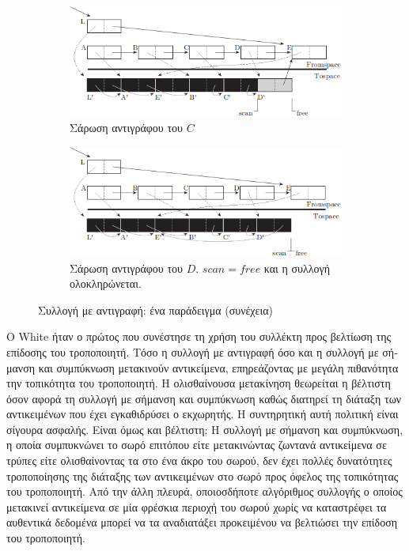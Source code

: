 \begin{greek}
\begin{figure}[H]
  \begin{subfigure}[b]{1.0\textwidth}
    \includegraphics{figures/cop_2b}
    \caption{Σάρωση αντιγράφου του $C$}
  \end{subfigure}
  
  \begin{subfigure}[b]{1.0\textwidth}
    \includegraphics{figures/cop_2c}
    \caption{Σάρωση αντιγράφου του $D$. $scan=free$ και η 
             συλλογή ολοκληρώνεται.}
  \end{subfigure}
  \caption{Συλλογή με αντιγραφή: ένα παράδειγμα (συνέχεια)}
  \label{fig:cop_2}
\end{figure}

O White \cite{DBLP:conf/lfp/White80} ήταν ο πρώτος που συνέστησε τη χρήση του συλλέκτη
προς βελτίωση της επίδοσης του τροποποιητή. Τόσο η συλλογή με
αντιγραφή όσο και η συλλογή με σήμανση και συμπύκνωση μετακινούν
αντικείμενα, επηρεάζοντας με μεγάλη πιθανότητα την τοπικότητα
του τροποποιητή. Η ολισθαίνουσα μετακίνηση θεωρείται η βέλτιστη
όσον αφορά τη συλλογή με σήμανση και συμπύκνωση καθώς διατηρεί
τη διάταξη των αντικειμένων που έχει εγκαθιδρύσει ο εκχωρητής.
Η συντηρητική αυτή πολιτική είναι σίγουρα ασφαλής. Είναι όμως
και βέλτιστη; Η συλλογή με σήμανση και συμπύκνωση, η οποία 
συμπυκνώνει το σωρό επιτόπου είτε μετακινώντας ζωντανά αντικείμενα 
σε τρύπες είτε ολισθαίνοντας τα στο ένα άκρο του σωρού, δεν
έχει πολλές δυνατότητες τροποποίησης της διάταξης των αντικειμένων 
στο σωρό προς όφελος της τοπικότητας του τροποποιητή. Από την
άλλη πλευρά, οποιοσδήποτε αλγόριθμος συλλογής ο οποίος μετακινεί 
αντικείμενα σε μία φρέσκια περιοχή του σωρού χωρίς να καταστρέφει
τα αυθεντικά δεδομένα μπορεί να τα αναδιατάξει προκειμένου να
βελτιώσει την επίδοση του τροποποιητή.


\end{greek}
